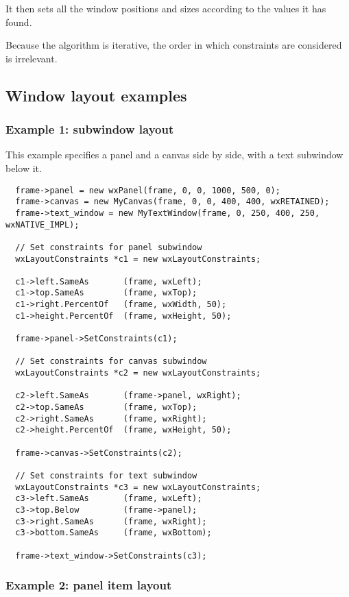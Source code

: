 It then sets all the window positions and sizes according to the values it has found.

Because the algorithm is iterative, the order in which constraints are considered is
irrelevant.

\subsection{Window layout examples}\label{layoutexamples}

\subsubsection{Example 1: subwindow layout}

This example specifies a panel and a canvas side by side,
with a text subwindow below it. 

\begin{verbatim}
  frame->panel = new wxPanel(frame, 0, 0, 1000, 500, 0);
  frame->canvas = new MyCanvas(frame, 0, 0, 400, 400, wxRETAINED);
  frame->text_window = new MyTextWindow(frame, 0, 250, 400, 250, wxNATIVE_IMPL);

  // Set constraints for panel subwindow
  wxLayoutConstraints *c1 = new wxLayoutConstraints;

  c1->left.SameAs       (frame, wxLeft);
  c1->top.SameAs        (frame, wxTop);
  c1->right.PercentOf   (frame, wxWidth, 50);
  c1->height.PercentOf  (frame, wxHeight, 50);

  frame->panel->SetConstraints(c1);

  // Set constraints for canvas subwindow
  wxLayoutConstraints *c2 = new wxLayoutConstraints;

  c2->left.SameAs       (frame->panel, wxRight);
  c2->top.SameAs        (frame, wxTop);
  c2->right.SameAs      (frame, wxRight);
  c2->height.PercentOf  (frame, wxHeight, 50);

  frame->canvas->SetConstraints(c2);

  // Set constraints for text subwindow
  wxLayoutConstraints *c3 = new wxLayoutConstraints;
  c3->left.SameAs       (frame, wxLeft);
  c3->top.Below         (frame->panel);
  c3->right.SameAs      (frame, wxRight);
  c3->bottom.SameAs     (frame, wxBottom);

  frame->text_window->SetConstraints(c3);
\end{verbatim}

\subsubsection{Example 2: panel item layout}

